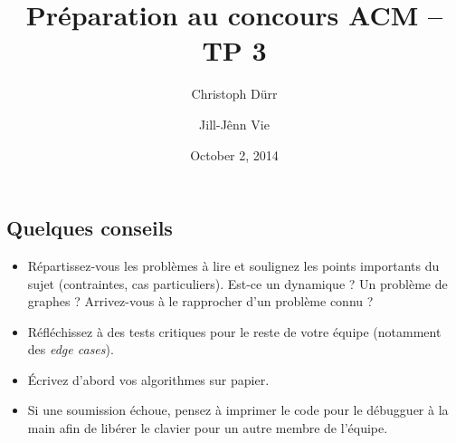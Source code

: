 \documentclass[12pt]{article}
\title{Préparation au concours ACM -- TP 3}
\author{Christoph Dürr \and Jill-Jênn Vie}
\date{October 2, 2014}
\begin{document}
\maketitle
\subsection*{Quelques conseils}

\begin{itemize}
\item Répartissez-vous les problèmes à lire et soulignez les points importants du sujet (contraintes, cas particuliers). Est-ce un dynamique ? Un problème de graphes ? Arrivez-vous à le rapprocher d'un problème connu ?
\item Réfléchissez à des tests critiques pour le reste de votre équipe (notamment des \emph{edge cases}).
\item Écrivez d'abord vos algorithmes sur papier.
\item Si une soumission échoue, pensez à imprimer le code pour le débugguer à la main afin de libérer le clavier pour un autre membre de l'équipe.
\end{itemize}
\end{document}
